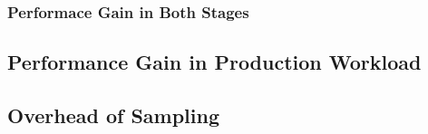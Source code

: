 \subsubsection{Performace Gain in Both Stages}
\subsection{Performance Gain in Production Workload}

\subsection{Overhead of Sampling}

